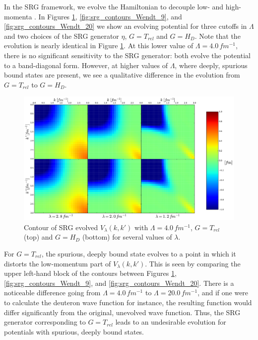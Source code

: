 \documentclass[preprintnumbers,floatfix,aps,prc,preprint]{revtex4-1}
\begin{document}
In the SRG framework, we evolve the Hamiltonian to decouple low- and high-momenta \cite{Bogner:2007,Bogner:2010}. In Figures \ref{fig:srg_contours_Wendt_4}, \ref{fig:srg_contours_Wendt_9}, and \ref{fig:srg_contours_Wendt_20} we show an evolving potential for three cutoffs in $\Lambda$ and two choices of the SRG generator $\eta$, $G=T_{rel}$ and $G=H_D$. Note that the evolution is nearly identical in Figure \ref{fig:srg_contours_Wendt_4}. At this lower value of $\Lambda=4.0 \, fm^{-1}$, there is no significant sensitivity to the SRG generator: both evolve the potential to a band-diagonal form. However, at higher values of $\Lambda$, where deeply, spurious bound states are present, we see a qualitative difference in the evolution from $G=T_{rel}$ to $G=H_D$. \\
%
\begin{figure}[H]
  \centering
  \includegraphics[width=14cm]{srg_contours_Wendt_4}
   \hspace*{0.05\textwidth}%
  \caption{Contour of SRG evolved $V_{\lambda}(k,k')$ with $\Lambda=4.0\,fm^{-1}$, $G=T_{rel}$ (top) and $G=H_{D}$ (bottom) for several values of $\lambda$.}
  \label{fig:srg_contours_Wendt_4}
\end{figure}
%
For $G=T_{rel}$, the spurious, deeply bound state evolves to a point in which it distorts the low-momentum part of $V_{\lambda}(k,k')$. This is seen by comparing the upper left-hand block of the contours between Figures \ref{fig:srg_contours_Wendt_4}, \ref{fig:srg_contours_Wendt_9}, and \ref{fig:srg_contours_Wendt_20}. There is a noticeable difference going from $\Lambda=4.0 \, fm^{-1}$ to $\Lambda=20.0 \, fm^{-1}$, and if one were to calculate the deuteron wave function for instance, the resulting function would differ significantly from the original, unevolved wave function. Thus, the SRG generator corresponding to $G=T_{rel}$ leads to an undesirable evolution for potentials with spurious, deeply bound states. \\
\end{document}
